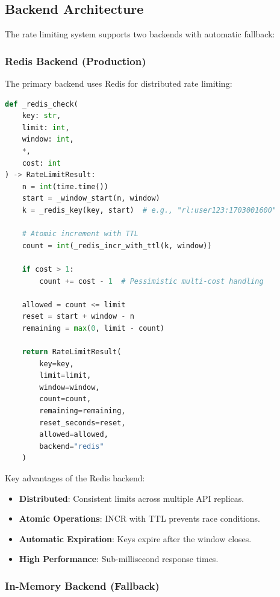 \subsection{Backend Architecture}
\label{subsec:rate-limit-backends}

The rate limiting system supports two backends with automatic fallback:

\subsubsection{Redis Backend (Production)}

The primary backend uses Redis for distributed rate limiting:

\begin{lstlisting}[language=Python,caption={Redis-based rate limiting}]
def _redis_check(
    key: str, 
    limit: int, 
    window: int, 
    *, 
    cost: int
) -> RateLimitResult:
    n = int(time.time())
    start = _window_start(n, window)
    k = _redis_key(key, start)  # e.g., "rl:user123:1703001600"
    
    # Atomic increment with TTL
    count = int(_redis_incr_with_ttl(k, window))
    
    if cost > 1:
        count += cost - 1  # Pessimistic multi-cost handling
    
    allowed = count <= limit
    reset = start + window - n
    remaining = max(0, limit - count)
    
    return RateLimitResult(
        key=key,
        limit=limit,
        window=window,
        count=count,
        remaining=remaining,
        reset_seconds=reset,
        allowed=allowed,
        backend="redis"
    )
\end{lstlisting}

Key advantages of the Redis backend:
\begin{itemize}
    \item \textbf{Distributed}: Consistent limits across multiple API replicas.
    \item \textbf{Atomic Operations}: INCR with TTL prevents race conditions.
    \item \textbf{Automatic Expiration}: Keys expire after the window closes.
    \item \textbf{High Performance}: Sub-millisecond response times.
\end{itemize}

\subsubsection{In-Memory Backend (Fallback)}

